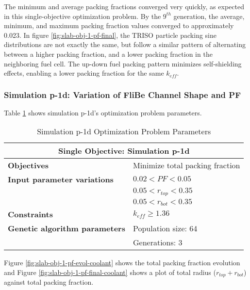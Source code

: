 The minimum and average packing fractions converged very quickly, as expected 
in this single-objective optimization problem.
By the $9^{th}$ generation, the average, minimum, and maximum packing fraction
values converged to approximately 0.023. 
In figure \ref{fig:slab-obj-1-pf-final}, the TRISO particle packing 
sine distributions are not exactly the same, but follow a similar pattern of 
alternating between a higher packing fraction, and a lower packing fraction 
in the neighboring fuel cell. 
The up-down fuel packing pattern minimizes self-shielding effects, enabling  
a lower packing fraction for the same $k_{eff}$. 

\subsubsection{Simulation p-1d: Variation of FliBe Channel Shape and PF}
Table \ref{tab:simulationp1d} shows simulation p-1d's optimization problem parameters. 
\begin{table}[htbp]
    \centering
    \onehalfspacing
    \caption{Simulation p-1d Optimization Problem Parameters}
	\label{tab:simulationp1d}
    \footnotesize
    \begin{tabular}{l|p{5cm}}
    \hline 
    \multicolumn{2}{c}{\textbf{Single Objective: Simulation p-1d}} \\
    \hline 
    \textbf{Objectives} & Minimize total packing fraction\\
    \hline 
    \textbf{Input parameter variations} & $0.02<PF<0.05$ \\
    & $0.05<r_{top}<0.35$ \\
    & $0.05<r_{bot}<0.35$ \\
    \hline
    \textbf{Constraints} & $k_{eff} \geq 1.36$\\ 
    \hline 
    \textbf{Genetic algorithm parameters} & Population size: 64 \\
    & Generations: 3 \\
    \hline
    \end{tabular}
\end{table}
Figure \ref{fig:slab-obj-1-pf-evol-coolant} shows the total packing fraction evolution 
and Figure \ref{fig:slab-obj-1-pf-final-coolant} shows a plot of total radius 
($r_{top} + r_{bot}$) against total packing fraction. 
